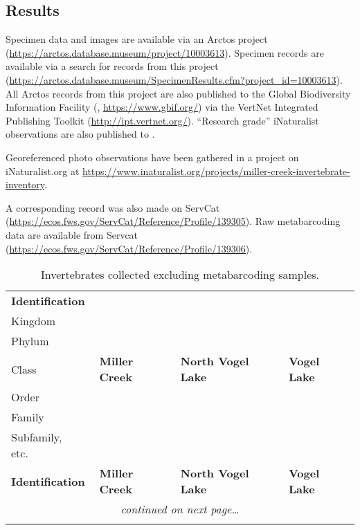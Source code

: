 \begin{multicols}{2}
\section{Results}

Specimen data and images are available via an Arctos project (\url{https://arctos.database.museum/project/10003613}). Specimen records are available via a search for records from this project (\url{https://arctos.database.museum/SpecimenResults.cfm?project_id=10003613}). All Arctos records from this project are also published to the Global Biodiversity Information Facility (, \url{https://www.gbif.org/}) via the VertNet Integrated Publishing Toolkit (\url{http://ipt.vertnet.org/}). ``Research grade'' iNaturalist observations are also published to .

Georeferenced photo observations have been gathered in a project on iNaturalist.org at \url{https://www.inaturalist.org/projects/miller-creek-invertebrate-inventory}.

A corresponding record was also made on ServCat (\url{https://ecos.fws.gov/ServCat/Reference/Profile/139305}). Raw metabarcoding data are available from Servcat (\url{https://ecos.fws.gov/ServCat/Reference/Profile/139306}).

\end{multicols}

\begin{longtable}{p{3in}p{1.2in}p{1.2in}p{1.2in}}
\caption{Invertebrates collected excluding metabarcoding samples.}\label{tableids}\\

\hline
\hline
\textbf{Identification}&&&\\ 
\hspace{0em}Kingdom&&&\\
\hspace{0.8em}Phylum&&&\\
\hspace{1.6em}Class& \textbf{Miller Creek} & \textbf{North Vogel Lake} & \textbf{Vogel Lake}\\
\hspace{2.4em}Order&&&\\
\hspace{3.2em}Family&&&\\
\hspace{4.0em}Subfamily, etc.\ &&&\\
\hline
\endfirsthead

\hline
\textbf{Identification} & \textbf{Miller Creek} & \textbf{North Vogel Lake} & \textbf{Vogel Lake}\\
\hline
\endhead

\multicolumn{4}{c}{\textit{continued on next page\ldots}}\\
\hline
\endfoot

\hline
\hline
\endlastfoot



\end{longtable}

